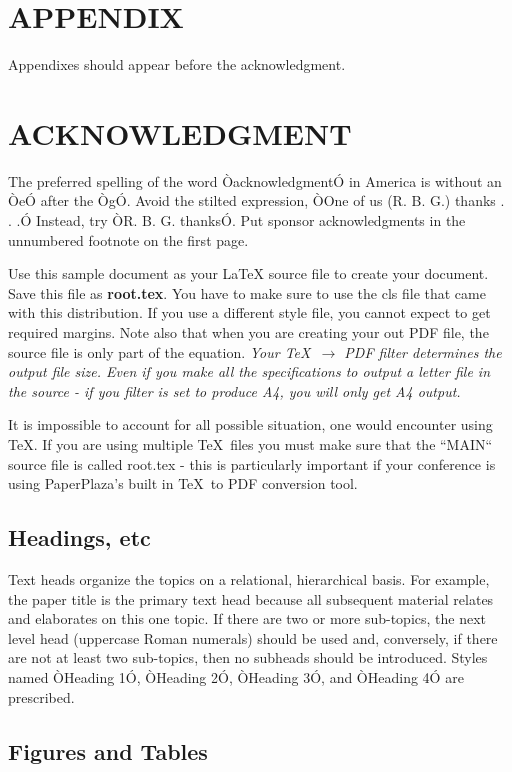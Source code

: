 \documentclass[a4paper, 10pt, conference]{ieeeconf}      %
\begin{document}
\section*{APPENDIX}

Appendixes should appear before the acknowledgment.

\section*{ACKNOWLEDGMENT}

The preferred spelling of the word ÒacknowledgmentÓ in America is without an ÒeÓ after the ÒgÓ. Avoid the stilted expression, ÒOne of us (R. B. G.) thanks . . .Ó  Instead, try ÒR. B. G. thanksÓ. Put sponsor acknowledgments in the unnumbered footnote on the first page.

Use this sample document as your LaTeX source file to create your document. Save this file as {\bf root.tex}. You have to make sure to use the cls file that came with this distribution. If you use a different style file, you cannot expect to get required margins. Note also that when you are creating your out PDF file, the source file is only part of the equation. {\it Your \TeX\ $\rightarrow$ PDF filter determines the output file size. Even if you make all the specifications to output a letter file in the source - if you filter is set to produce A4, you will only get A4 output. }

It is impossible to account for all possible situation, one would encounter using \TeX. If you are using multiple \TeX\ files you must make sure that the ``MAIN`` source file is called root.tex - this is particularly important if your conference is using PaperPlaza's built in \TeX\ to PDF conversion tool.

\subsection{Headings, etc}

Text heads organize the topics on a relational, hierarchical basis. For example, the paper title is the primary text head because all subsequent material relates and elaborates on this one topic. If there are two or more sub-topics, the next level head (uppercase Roman numerals) should be used and, conversely, if there are not at least two sub-topics, then no subheads should be introduced. Styles named ÒHeading 1Ó, ÒHeading 2Ó, ÒHeading 3Ó, and ÒHeading 4Ó are prescribed.

\subsection{Figures and Tables}
\end{document}
